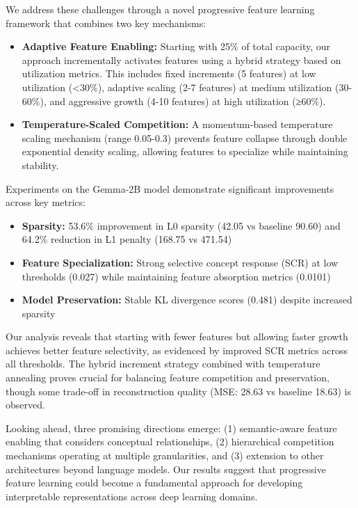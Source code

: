 \documentclass{article} %
\begin{document}
We address these challenges through a novel progressive feature learning framework that combines two key mechanisms:

\begin{itemize}
    \item \textbf{Adaptive Feature Enabling:} Starting with 25\% of total capacity, our approach incrementally activates features using a hybrid strategy based on utilization metrics. This includes fixed increments (5 features) at low utilization (<30\%), adaptive scaling (2-7 features) at medium utilization (30-60\%), and aggressive growth (4-10 features) at high utilization (≥60\%).
    
    \item \textbf{Temperature-Scaled Competition:} A momentum-based temperature scaling mechanism (range 0.05-0.3) prevents feature collapse through double exponential density scaling, allowing features to specialize while maintaining stability.
\end{itemize}

Experiments on the Gemma-2B model demonstrate significant improvements across key metrics:

\begin{itemize}
    \item \textbf{Sparsity:} 53.6\% improvement in L0 sparsity (42.05 vs baseline 90.60) and 64.2\% reduction in L1 penalty (168.75 vs 471.54)
    \item \textbf{Feature Specialization:} Strong selective concept response (SCR) at low thresholds (0.027) while maintaining feature absorption metrics (0.0101)
    \item \textbf{Model Preservation:} Stable KL divergence scores (0.481) despite increased sparsity
\end{itemize}

Our analysis reveals that starting with fewer features but allowing faster growth achieves better feature selectivity, as evidenced by improved SCR metrics across all thresholds. The hybrid increment strategy combined with temperature annealing proves crucial for balancing feature competition and preservation, though some trade-off in reconstruction quality (MSE: 28.63 vs baseline 18.63) is observed.

Looking ahead, three promising directions emerge: (1) semantic-aware feature enabling that considers conceptual relationships, (2) hierarchical competition mechanisms operating at multiple granularities, and (3) extension to other architectures beyond language models. Our results suggest that progressive feature learning could become a fundamental approach for developing interpretable representations across deep learning domains.
\end{document}
